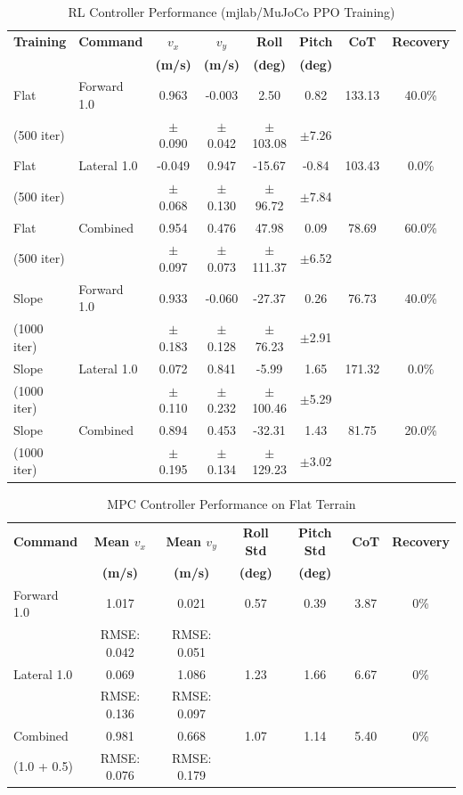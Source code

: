 \documentclass[12pt,a4paper]{article}
\begin{document}
\begin{table}[h!]
\centering
\caption{RL Controller Performance (mjlab/MuJoCo PPO Training)}
\small
\begin{tabular}{|l|l|c|c|c|c|c|c|}
\hline
\textbf{Training} & \textbf{Command} & \textbf{$v_x$} & \textbf{$v_y$} & \textbf{Roll} & \textbf{Pitch} & \textbf{CoT} & \textbf{Recovery} \\
 & & \textbf{(m/s)} & \textbf{(m/s)} & \textbf{(deg)} & \textbf{(deg)} & & \\
\hline
\hline
Flat & Forward 1.0 & 0.963 & -0.003 & 2.50 & 0.82 & 133.13 & 40.0\% \\
(500 iter) & & $\pm$0.090 & $\pm$0.042 & $\pm$103.08 & $\pm$7.26 & & \\
\hline
Flat & Lateral 1.0 & -0.049 & 0.947 & -15.67 & -0.84 & 103.43 & 0.0\% \\
(500 iter) & & $\pm$0.068 & $\pm$0.130 & $\pm$96.72 & $\pm$7.84 & & \\
\hline
Flat & Combined & 0.954 & 0.476 & 47.98 & 0.09 & 78.69 & 60.0\% \\
(500 iter) & & $\pm$0.097 & $\pm$0.073 & $\pm$111.37 & $\pm$6.52 & & \\
\hline
\hline
Slope & Forward 1.0 & 0.933 & -0.060 & -27.37 & 0.26 & 76.73 & 40.0\% \\
(1000 iter) & & $\pm$0.183 & $\pm$0.128 & $\pm$76.23 & $\pm$2.91 & & \\
\hline
Slope & Lateral 1.0 & 0.072 & 0.841 & -5.99 & 1.65 & 171.32 & 0.0\% \\
(1000 iter) & & $\pm$0.110 & $\pm$0.232 & $\pm$100.46 & $\pm$5.29 & & \\
\hline
Slope & Combined & 0.894 & 0.453 & -32.31 & 1.43 & 81.75 & 20.0\% \\
(1000 iter) & & $\pm$0.195 & $\pm$0.134 & $\pm$129.23 & $\pm$3.02 & & \\
\hline
\end{tabular}
\end{table}

\vspace{0.3cm}

\begin{table}[h!]
\centering
\caption{MPC Controller Performance on Flat Terrain}
\small
\begin{tabular}{|l|c|c|c|c|c|c|}
\hline
\textbf{Command} & \textbf{Mean $v_x$} & \textbf{Mean $v_y$} & \textbf{Roll Std} & \textbf{Pitch Std} & \textbf{CoT} & \textbf{Recovery} \\
 & \textbf{(m/s)} & \textbf{(m/s)} & \textbf{(deg)} & \textbf{(deg)} & & \\
\hline
Forward 1.0 & 1.017 & 0.021 & 0.57 & 0.39 & 3.87 & 0\% \\
 & RMSE: 0.042 & RMSE: 0.051 & & & & \\
\hline
Lateral 1.0 & 0.069 & 1.086 & 1.23 & 1.66 & 6.67 & 0\% \\
 & RMSE: 0.136 & RMSE: 0.097 & & & & \\
\hline
Combined & 0.981 & 0.668 & 1.07 & 1.14 & 5.40 & 0\% \\
(1.0 + 0.5) & RMSE: 0.076 & RMSE: 0.179 & & & & \\
\hline
\end{tabular}
\end{table}
\end{document}
